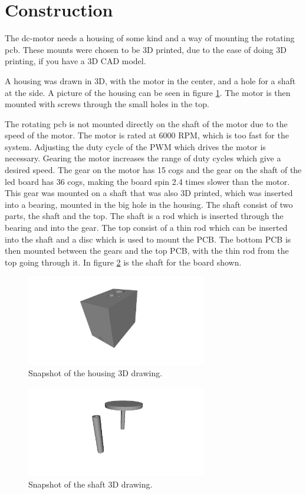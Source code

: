 \section{Construction}
The dc-motor needs a housing of some kind and a way of mounting the rotating pcb.
These mounts were chosen to be 3D printed, due to the ease of doing 3D printing, if you have a 3D CAD model.

A housing was drawn in 3D, with the motor in the center, and a hole for a shaft at the side. 
A picture of the housing can be seen in figure \ref{fig:housing3D}.
The motor is then mounted with screws through the small holes in the top.

The rotating pcb is not mounted directly on the shaft of the motor due to the speed of the motor.
The motor is rated at 6000 RPM, which is too fast for the system.
Adjusting the duty cycle of the PWM which drives the motor is necessary.
Gearing the motor increases the range of duty cycles which give a desired speed.
The gear on the motor has 15 cogs and the gear on the shaft of the led board has 36 cogs, making the board spin 2.4 times slower than the motor.
This gear was mounted on a shaft that was also 3D printed, which was inserted into a bearing, mounted in the big hole in the housing.
The shaft consist of two parts, the shaft and the top.
The shaft is a rod which is inserted through the bearing and into the gear.
The top consist of a thin rod which can be inserted into the shaft and a disc which is used to mount the PCB.
The bottom PCB is then mounted between the gears and the top PCB, with the thin rod from the top going through it.
In figure \ref{fig:shaft3D} is the shaft for the board shown.

\begin{figure}[H]
 \centering
 \includegraphics[width=0.7\textwidth]{img/housing3D}
 \caption{Snapshot of the housing 3D drawing.}
 \label{fig:housing3D}
\end{figure}

\begin{figure}[H]
 \centering
 \includegraphics[width=0.7\textwidth]{img/shaft_3d}
 \caption{Snapshot of the shaft 3D drawing.}
 \label{fig:shaft3D}
\end{figure}

